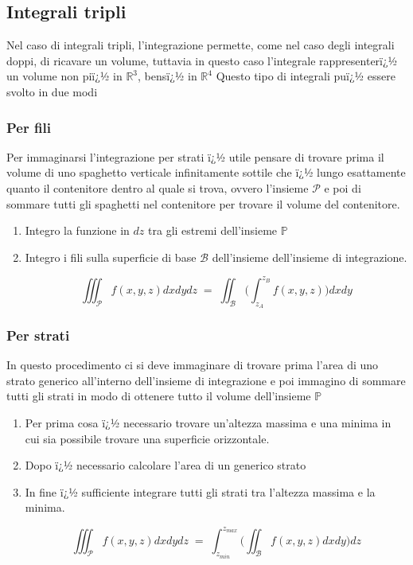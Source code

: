 \documentclass[10pt,a4paper]{report}
\begin{document}
		\subsection*{Integrali tripli}
		Nel caso di integrali tripli, l'integrazione permette, come nel caso degli integrali doppi, di ricavare un volume, tuttavia in questo caso l'integrale rappresenterï¿½ un volume non piï¿½ in $ \mathbb{R}^{3} $, bensï¿½ in $ \mathbb{R}^{4} $
		Questo tipo di integrali puï¿½ essere svolto in due modi
			\subsubsection{Per fili}
			Per immaginarsi l'integrazione per strati ï¿½ utile pensare di trovare prima il volume di uno spaghetto verticale infinitamente sottile che ï¿½ lungo esattamente quanto il contenitore dentro al quale si trova, ovvero l'insieme $\mathcal{P}$ e poi di sommare tutti gli spaghetti nel contenitore per trovare il volume del contenitore.
				\begin{enumerate}
					\item Integro la funzione in $ dz $ tra gli estremi dell'insieme $ \mathbb{P} $
					\item Integro i fili sulla superficie di base $ \mathcal{B} $ dell'insieme dell'insieme di integrazione.
					
					\[ \iiint_{\mathcal{P}} f(x,y,z) dxdydz \; = \; \iint_{\mathcal{B}} \Big(\int_{z_{A}}^{z_{B}} f(x,y,z)\Big) dxdy\]
					
				\end{enumerate}
			\subsubsection{Per strati}
			In questo procedimento ci si deve immaginare di trovare prima l'area di uno strato generico all'interno dell'insieme di integrazione e poi immagino di sommare tutti gli strati in modo di ottenere tutto il volume dell'insieme $ \mathbb{P} $
				\begin{enumerate}
					\item Per prima cosa ï¿½ necessario trovare un'altezza massima e una minima in cui sia possibile trovare una superficie orizzontale.
					\item Dopo ï¿½ necessario calcolare l'area di un generico strato
					\item In fine ï¿½ sufficiente integrare tutti gli strati tra l'altezza massima e la minima.
					
					\[ \iiint_{\mathcal{P}} f(x,y,z) dxdydz \; = \; \int_{z_{min}}^{z_{max}} \Big(\iint_{\mathcal{B}} f(x,y,z) dxdy\Big)dz \]
					
				\end{enumerate}
		
\end{document}
